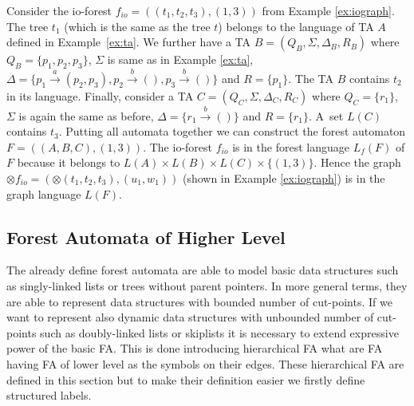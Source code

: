 \documentclass[a4paper, 12pt]{article}
\begin{document}
\bexmp
Consider the io-forest $f_{io}=((t_1,t_2,t_3), (1,3))$ from Example \ref{ex:iograph}.
The tree $t_1$ (which is the same as the tree $t$) belongs to the language of TA $A$
defined in Example~\ref{ex:ta}.
We further have a TA $B=(Q_B,\Sigma, \Delta_B, R_B)$ where $Q_B=\{p_1,p_2,p_3\}$,
$\Sigma$ is same as in Example \ref{ex:ta},
$\Delta=\{p_1 \xrightarrow{a} (p_2,p_3),
p_2 \xrightarrow{b} (),
p_3 \xrightarrow{b} ()\}$
and $R=\{p_1\}$.
The TA $B$ contains $t_2$ in its language.
Finally, consider a TA $C=(Q_C,\Sigma, \Delta_C, R_C)$ where $Q_C=\{r_1\}$,
$\Sigma$ is again the same as before,
$\Delta= \{r_1 \xrightarrow{b} ()\}$
and $R=\{r_1\}$.
A~set $L(C)$ contains $t_3$.
Putting all automata together we can construct the forest automaton $F=((A,B,C),(1,3))$.
The io-forest $f_{io}$ is in the forest language $L_f(F)$ of $F$ because it belongs
to $L(A) \times L(B) \times L(C) \times \{(1,3)\}$.
Hence the graph $\otimes f_{io} = (\otimes (t_1,t_2,t_3),(u_1,w_1))$
(shown in Example \ref{ex:iograph}) is in the graph language $L(F)$.
\eexmp

\subsection{Forest Automata of Higher Level}
\label{sec:fah}

The already define forest automata are able to model basic data structures
such as singly-linked lists or trees without parent pointers.
In more general terms, they are able to represent data structures
with bounded number of cut-points.
If we want to represent also dynamic data structures with unbounded
number of cut-points such as doubly-linked lists or skiplists it
is necessary to extend expressive power of the basic FA.
This is done introducing hierarchical FA what are FA having FA of lower level
as the symbols on their edges.
These hierarchical FA are defined in this section but to make their
definition easier we firstly define structured labels.
\end{document}
